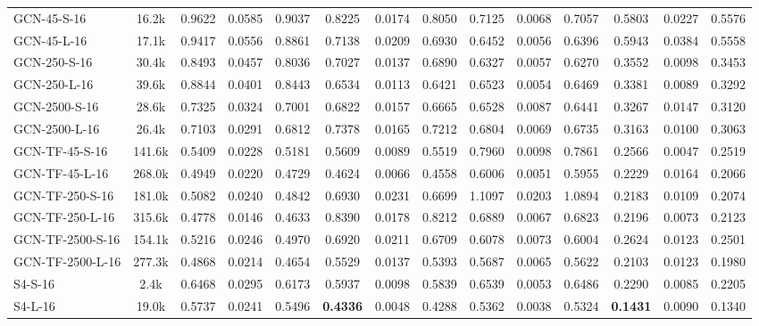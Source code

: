 \begin{table*}[h]
{\begin{tabular}{l c >{\columncolor{gray!20}}ccc >{\columncolor{gray!20}}ccc >{\columncolor{gray!20}}ccc >{\columncolor{gray!20}}ccc}
            \hline
            GCN-45-S-16 & 16.2k & 0.9622 & 0.0585 & 0.9037 & 0.8225 & 0.0174 & 0.8050 & 0.7125 & 0.0068 & 0.7057 & 0.5803 & 0.0227 & 0.5576 \\ 
            GCN-45-L-16 & 17.1k & 0.9417 & 0.0556 & 0.8861 & 0.7138 & 0.0209 & 0.6930 & 0.6452 & 0.0056 & 0.6396 & 0.5943 & 0.0384 & 0.5558 \\
            GCN-250-S-16 & 30.4k & 0.8493 & 0.0457 & 0.8036 & 0.7027 & 0.0137 & 0.6890 & 0.6327 & 0.0057 & 0.6270 & 0.3552 & 0.0098 & 0.3453 \\ 
            GCN-250-L-16 & 39.6k & 0.8844 & 0.0401 & 0.8443 & 0.6534 & 0.0113 & 0.6421 & 0.6523 & 0.0054 & 0.6469 & 0.3381 & 0.0089 & 0.3292 \\
            GCN-2500-S-16 & 28.6k & 0.7325 & 0.0324 & 0.7001 & 0.6822 & 0.0157 & 0.6665 & 0.6528 & 0.0087 & 0.6441 & 0.3267 & 0.0147 & 0.3120 \\ 
            GCN-2500-L-16 & 26.4k & 0.7103 & 0.0291 & 0.6812 & 0.7378 & 0.0165 & 0.7212 & 0.6804 & 0.0069 & 0.6735 & 0.3163 & 0.0100 & 0.3063 \\
            \hline
            GCN-TF-45-S-16 & 141.6k & 0.5409 & 0.0228 & 0.5181 & 0.5609 & 0.0089 & 0.5519 & 0.7960 & 0.0098 & 0.7861 & 0.2566 & 0.0047 & 0.2519 \\
            GCN-TF-45-L-16 & 268.0k & 0.4949 & 0.0220 & 0.4729 & 0.4624 & 0.0066 & 0.4558 & 0.6006 & 0.0051 & 0.5955 & 0.2229 & 0.0164 & 0.2066 \\
            GCN-TF-250-S-16 & 181.0k & 0.5082 & 0.0240 & 0.4842 & 0.6930 & 0.0231 & 0.6699 & 1.1097 & 0.0203 & 1.0894 & 0.2183 & 0.0109 & 0.2074 \\
            GCN-TF-250-L-16 & 315.6k & 0.4778 & 0.0146 & 0.4633 & 0.8390 & 0.0178 & 0.8212 & 0.6889 & 0.0067 & 0.6823 & 0.2196 & 0.0073 & 0.2123 \\
            GCN-TF-2500-S-16 & 154.1k & 0.5216 & 0.0246 & 0.4970 & 0.6920 & 0.0211 & 0.6709 & 0.6078 & 0.0073 & 0.6004 & 0.2624 & 0.0123 & 0.2501 \\
            GCN-TF-2500-L-16 & 277.3k & 0.4868 & 0.0214 & 0.4654 & 0.5529 & 0.0137 & 0.5393 & 0.5687 & 0.0065 & 0.5622 & 0.2103 & 0.0123 & 0.1980 \\
            \hline
            S4-S-16 & 2.4k & 0.6468 & 0.0295 & 0.6173 & 0.5937 & 0.0098 & 0.5839 & 0.6539 & 0.0053 & 0.6486 & 0.2290 & 0.0085 & 0.2205 \\
            S4-L-16 & 19.0k & 0.5737 & 0.0241 & 0.5496 & \textbf{0.4336} & 0.0048 & 0.4288 & 0.5362 & 0.0038 & 0.5324 & \textbf{0.1431} & 0.0090 & 0.1340 \\

\end{tabular}}
\end{table*}
